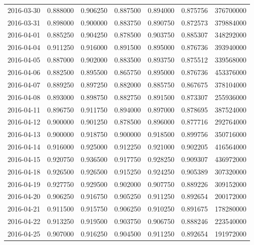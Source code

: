 \begin{tabular}{lrrrrrr}
2016-03-30 &    0.888000 &    0.906250 &    0.887500 &    0.894000 &    0.875756 &   376700000 \\
2016-03-31 &    0.898000 &    0.900000 &    0.883750 &    0.890750 &    0.872573 &   379884000 \\
2016-04-01 &    0.885250 &    0.904250 &    0.878500 &    0.903750 &    0.885307 &   348292000 \\
2016-04-04 &    0.911250 &    0.916000 &    0.891500 &    0.895000 &    0.876736 &   393940000 \\
2016-04-05 &    0.887000 &    0.902000 &    0.883500 &    0.893750 &    0.875512 &   339568000 \\
2016-04-06 &    0.882500 &    0.895500 &    0.865750 &    0.895000 &    0.876736 &   453376000 \\
2016-04-07 &    0.889250 &    0.897250 &    0.882000 &    0.885750 &    0.867675 &   378104000 \\
2016-04-08 &    0.893000 &    0.898750 &    0.882750 &    0.891500 &    0.873307 &   255936000 \\
2016-04-11 &    0.896750 &    0.911750 &    0.894000 &    0.897000 &    0.878695 &   387524000 \\
2016-04-12 &    0.900000 &    0.901250 &    0.878500 &    0.896000 &    0.877716 &   292764000 \\
2016-04-13 &    0.900000 &    0.918750 &    0.900000 &    0.918500 &    0.899756 &   350716000 \\
2016-04-14 &    0.916000 &    0.925000 &    0.912250 &    0.921000 &    0.902205 &   416564000 \\
2016-04-15 &    0.920750 &    0.936500 &    0.917750 &    0.928250 &    0.909307 &   436972000 \\
2016-04-18 &    0.926500 &    0.926500 &    0.915250 &    0.924250 &    0.905389 &   307320000 \\
2016-04-19 &    0.927750 &    0.929500 &    0.902000 &    0.907750 &    0.889226 &   309152000 \\
2016-04-20 &    0.906250 &    0.916750 &    0.905250 &    0.911250 &    0.892654 &   200172000 \\
2016-04-21 &    0.911500 &    0.915750 &    0.906250 &    0.910250 &    0.891675 &   178280000 \\
2016-04-22 &    0.913250 &    0.919500 &    0.903750 &    0.906750 &    0.888246 &   223540000 \\
2016-04-25 &    0.907000 &    0.916250 &    0.904500 &    0.911250 &    0.892654 &   191972000 \\

\end{tabular}
